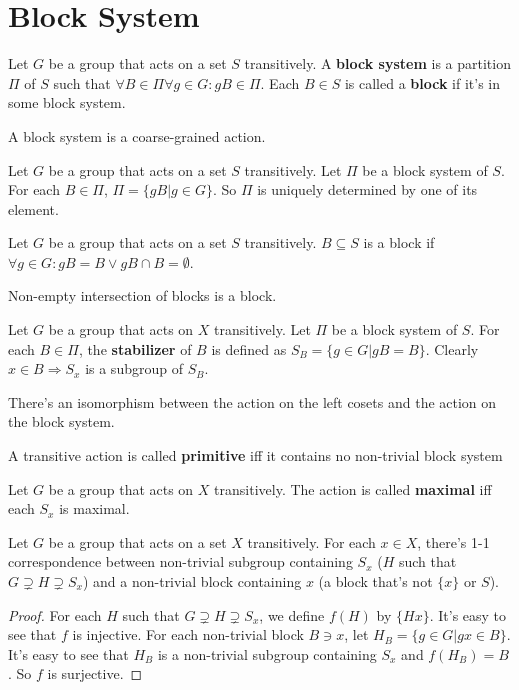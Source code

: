 \documentclass[12pt]{book}
\begin{document}
\section{Block System}
	
\begin{definition}
	Let $G$ be a group that acts on a set $S$ transitively. A {\bf block system} is a partition $\Pi$ of $S$ such that $\forall B\in \Pi\forall g\in G:gB\in \Pi$. Each $B\in S$ is called a {\bf block} if it's in some block system.
\end{definition}

A block system is a coarse-grained action.

\begin{lemma}
	Let $G$ be a group that acts on a set $S$ transitively. Let $\Pi$ be a block system of $S$. For each $B\in \Pi$, $\Pi=\{gB|g\in G\}$. So $\Pi$ is uniquely determined by one of its element.
\end{lemma}

\begin{lemma}
	Let $G$ be a group that acts on a set $S$ transitively. $B\subseteq S$ is a block if $\forall g\in G: gB=B\vee gB\cap B=\emptyset$.
\end{lemma}

\begin{lemma}
	Non-empty intersection of blocks is a block.
\end{lemma}

\begin{definition}
	Let $G$ be a group that acts on $X$ transitively. Let $\Pi$ be a block system of $S$. For each $B\in \Pi$, the {\bf stabilizer} of $B$ is defined as $S_B=\{g\in G|gB=B\}$. Clearly $x\in B\Rightarrow S_x$ is a subgroup of $S_B$.
\end{definition}

There's an isomorphism between the action on the left cosets and the action on the block system.

\begin{definition}
	A transitive action is called {\bf primitive} iff it contains no non-trivial block system
\end{definition}
\begin{definition}
	Let $G$ be a group that acts on $X$ transitively. The action is called {\bf maximal} iff each $S_x$ is maximal.
\end{definition}

\begin{lemma}
	Let $G$ be a group that acts on a set $X$ transitively. For each $x\in X$, there's 1-1 correspondence between non-trivial subgroup containing $S_x$ ($H$ such that $G\supsetneq H\supsetneq S_x$) and a non-trivial block containing $x$ (a block that's not $\{x\}$ or $S$).
\end{lemma}
\begin{proof}
	For each $H$ such that $G\supsetneq H\supsetneq S_x$, we define $f(H)$ by $\{Hx\}$. It's easy to see that $f$ is injective. For each non-trivial block $B\ni x$, let $H_B=\{g\in G|gx\in B\}$. It's easy to see that $H_B$ is a non-trivial subgroup containing $S_x$ and $f(H_B)=B$. So $f$ is surjective.
\end{proof}
\end{document}

